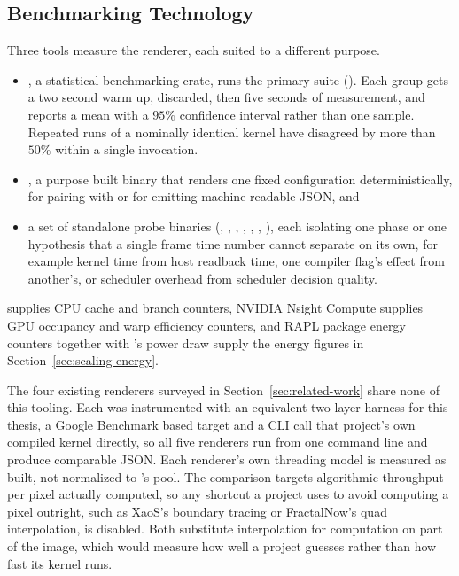 \documentclass{ftndiplomski}
\begin{document}
\subsection{Benchmarking Technology}
\label{sec:benchmarking-tech}

Three tools measure the renderer, each suited to a different purpose.
\begin{itemize}
  \item {}, a statistical benchmarking crate, runs the primary
  suite (). Each group gets a two second warm up,
  discarded, then five seconds of measurement, and reports a mean with a
  $95\%$ confidence interval rather than one sample. Repeated runs of a
  nominally identical kernel have disagreed by more than $50\%$ within a
  single  invocation.
  \item {}, a purpose built binary that renders one fixed
  configuration deterministically, for pairing with  or for
  emitting machine readable JSON, and
  \item a set of standalone probe binaries (,
  , , ,
  , , ),
  each isolating one phase or one hypothesis that a single frame time
  number cannot separate on its own, for example kernel time from host
  readback time, one compiler flag's effect from another's, or scheduler
  overhead from scheduler decision quality.
\end{itemize}
 supplies CPU cache and branch counters, NVIDIA Nsight
Compute supplies GPU occupancy and warp efficiency counters, and RAPL
package energy counters together with 's power draw supply
the energy figures in Section~\ref{sec:scaling-energy}.

The four existing renderers surveyed in Section~\ref{sec:related-work}
share none of this tooling. Each was instrumented with an equivalent
two layer harness for this thesis, a Google Benchmark based
 target and a  CLI call that
project's own compiled kernel directly, so all five renderers run from one
command line and produce comparable JSON. Each renderer's own threading
model is measured as built, not normalized to 's pool. The
comparison targets algorithmic throughput per pixel actually computed, so
any shortcut a project uses to avoid computing a pixel outright, such as
XaoS's boundary tracing or FractalNow's quad interpolation, is disabled.
Both substitute interpolation for computation on part of the image, which
would measure how well a project guesses rather than how fast its kernel
runs.
\end{document}
